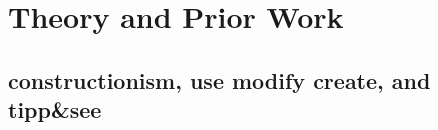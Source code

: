 \documentclass[sigconf,manuscript,review,anonymous]{acmart} %
\def\ts{TIPP\&SEE}
\def\umc{Use\begin{math}\rightarrow\end{math}Modify\begin{math}\rightarrow\end{math}Create\ }
\def\um{Use\begin{math}\rightarrow\end{math}Modify\ }
\begin{document}

\section{Theory and Prior Work}
\label{sec:background}
\thispagestyle{empty}

\subsection{constructionism, use modify create, and tipp\&see}
\end{document}
